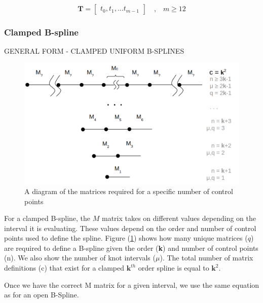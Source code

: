 \documentclass{article}
\begin{document}
    \begin{equation}
        \textbf{T} = \begin{bmatrix} t_0, t_1, ... t_{m-1} \end{bmatrix} \quad \text{,} \quad m \geq 12
    \end{equation}

\subsubsection{Clamped B-spline}

\hspace{1cm}
\noindent GENERAL FORM - CLAMPED UNIFORM B-SPLINES
\hfill \break

\begin{figure}[H]
\begin{center}
\includegraphics[scale=.23]{ClampedMatricesReducedN.png}
\end{center}
\caption{A diagram of the matrices required for a specific number of control points}
\label{Fig:ClampedMatricesWithReducedN}
\end{figure}

For a clamped B-spline, the \(M\) matrix takes on different values depending on the interval it is evaluating. These values depend on the order and number of control points used to define the spline. Figure (\ref{Fig:ClampedMatricesWithReducedN}) shows how many unique matrices (\(q\)) are required to define a B-spline given the order (\textbf{k}) and number of control points (n). We also show the number of knot intervals (\(\mu\)). The total number of matrix definitions (c) that exist for a clamped \(\textbf{k}^{th}\) order spline is equal to \(\textbf{k}^{2}\).

Once we have the correct M matrix for a given interval, we use the same equation as for an open B-Spline.
\end{document}
